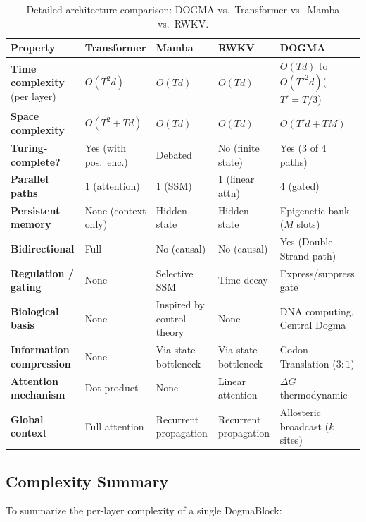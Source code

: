 \begin{table}[H]
\centering
\caption{Detailed architecture comparison: DOGMA vs.\ Transformer vs.\ Mamba vs.\ RWKV.}
\label{tab:architecture-comparison}
\renewcommand{\arraystretch}{1.2}
\footnotesize
\begin{tabularx}{\textwidth}{L{2.8cm} L{2.6cm} L{2.6cm} L{2.6cm} Y}
\toprule
\textbf{Property} & \textbf{Transformer} & \textbf{Mamba} & \textbf{RWKV} & \textbf{DOGMA} \\
\midrule
\textbf{Time complexity} (per layer) & $O(T^2 d)$ & $O(T d)$ & $O(T d)$ & $O(T d)$ to $O(T'^2 d)$\newline ($T' = T/3$) \\
\textbf{Space complexity} & $O(T^2 + Td)$ & $O(Td)$ & $O(Td)$ & $O(T'd + TM)$ \\
\textbf{Turing-complete?} & Yes (with pos.\ enc.) & Debated & No (finite state) & Yes (3 of 4 paths) \\
\textbf{Parallel paths} & 1 (attention) & 1 (SSM) & 1 (linear attn) & 4 (gated) \\
\textbf{Persistent memory} & None (context only) & Hidden state & Hidden state & Epigenetic bank ($M$ slots) \\
\textbf{Bidirectional} & Full & No (causal) & No (causal) & Yes (Double Strand path) \\
\textbf{Regulation / gating} & None & Selective SSM & Time-decay & Express/suppress gate \\
\textbf{Biological basis} & None & Inspired by control theory & None & DNA computing, Central Dogma \\
\textbf{Information compression} & None & Via state bottleneck & Via state bottleneck & Codon Translation ($3:1$) \\
\textbf{Attention mechanism} & Dot-product & None & Linear attention & $\Delta G$ thermodynamic \\
\textbf{Global context} & Full attention & Recurrent propagation & Recurrent propagation & Allosteric broadcast ($k$ sites) \\
\bottomrule
\end{tabularx}
\end{table}

\subsection{Complexity Summary}

To summarize the per-layer complexity of a single DogmaBlock:

